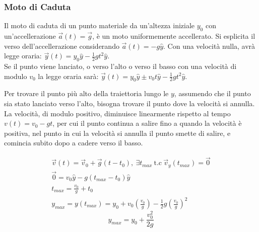 \documentclass{article}
\numberwithin{equation}{subsection}
\begin{document}
\subsubsection{Moto di Caduta}


Il moto di caduta di un punto materiale da un'altezza iniziale $y_0$ 
con un'accellerazione 
$\vec{a}(t) = \vec{g}$, 
è un moto uniformemente accellerato. Si esplicita il verso dell'accellerazione considerando $\vec{a}(t)=-g\hat y$. Con una velocità nulla, avrà  
legge oraria: $\vec y(t)= y_0\hat{y} -\displaystyle\frac{1}{2}gt^{2}\hat{y}$.\\

Se il punto viene lanciato, o verso l'alto o verso il basso
con una velocità di modulo $v_0$ la legge oraria sarà: 
$\vec y(t) = y_0\hat{y} \pm v_0t\hat{y}-\displaystyle\frac{1}{2}gt^{2}\hat{y}$.

\begin{center}\end{center}

Per trovare il punto più alto della traiettoria lungo le $y$,
assumendo che il punto sia stato lanciato verso l'alto, bisogna
trovare il punto dove la velocità si annulla. La velocità, di modulo positivo, diminuisce linearmente rispetto al tempo $v(t)=v_0-gt$, per cui il punto 
continua a salire fino a quando la velocità è positiva, nel punto in cui la velocità si annulla il punto smette di salire, e comincia subito dopo a 
cadere verso il basso. 

\begin{gather*}
    \vec{v}(t) = \vec{v}_0  + \vec{g}(t-t_0),\:\exists t_{max} \:\mbox{t.c}\:\vec{v}_y(t_{max}) = \vec{0}\\
    \vec0= v_0\hat{y} - g(t_{max}-t_0)\hat{y}\\
    t_{max} = \displaystyle\frac{v_0}{g} + t_0\\
    y_{max} = y(t_{max}) = y_0 + v_0\left(\displaystyle\frac{v_0}{g}\right) -
    \displaystyle\frac{1}{2}g\left(\displaystyle\frac{v_0}{g}\right)^{2}
\end{gather*}
\begin{equation}
    y_{max}=y_0 + \displaystyle\frac{v_0^{2}}{2g}
\end{equation}
\end{document}
